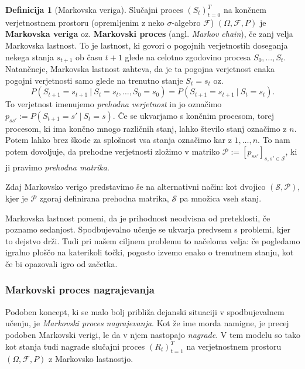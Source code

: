 \documentclass[12pt,a4paper]{amsart}
\theoremstyle{definition} %
\newtheorem{definicija}{Definicija}[section]
\theoremstyle{plain} %
\begin{document}
\begin{definicija}[Markovska veriga]\label{MarkovChain}
    Slučajni proces $(S_t)_{t=0}^T$ na končnem verjetnostnem prostoru (opremljenim z neko $\sigma$-algebro
    $\mathcal{F}$) $(\Omega, \mathcal{F}, P)$ je \textbf{Markovska veriga} oz. \textbf{Markovski proces} 
    (angl. \textit{Markov chain}), če zanj velja Markovska lastnost. To je lastnost, ki govori o 
    pogojnih verjetnostih doseganja nekega stanja $s_{t+1}$ ob času $t + 1$ glede na celotno zgodovino
    procesa $S_0, \dots, S_{t}$. Natančneje, Markovska lastnost zahteva, da je ta pogojna verjetnost 
    enaka pogojni verjetnosti samo glede na trenutno stanje $S_{t} = s_{t}$ oz.
    $$
    P(S_{t+1} = s_{t+1}~|~S_{t} = s_{t}, \dots, S_0 = s_0) = P(S_{t+1} = s_{t+1}~|~S_{t} = s_{t}).
    $$
    To verjetnost imenujemo \textit{prehodna verjetnost} in jo označimo $p_{ss'} := P(S_{t+1} = 
    s'~|~S_{t} = s)$. Če se ukvarjamo s končnim procesom, torej procesom, ki ima končno mnogo 
    različnih stanj, lahko število stanj označimo z $n$. Potem lahko brez škode za splošnost 
    vsa stanja označimo kar z $1, \dots, n$. To nam potem dovoljuje, da prehodne verjetnosti zložimo v 
    matriko $\mathcal{P} := [p_{ss'}]_{s,s'\in \mathcal{S} }$, ki ji pravimo \textit{prehodna matrika}.

    Zdaj Markovsko verigo predstavimo še na alternativni način: kot dvojico $(\mathcal{S}, 
    \mathcal{P})$, kjer je $\mathcal{P}$ zgoraj definirana prehodna matrika, $\mathcal{S}$ pa 
    množica vseh stanj.
\end{definicija}

Markovska lastnost pomeni, da je prihodnost neodvisna od preteklosti, če poznamo sedanjost. 
Spodbujevalno učenje se ukvarja predvsem s problemi, kjer to dejstvo drži. Tudi pri našem 
ciljnem problemu to načeloma velja: če pogledamo igralno ploščo na katerikoli točki, pogosto 
izvemo enako o trenutnem stanju, kot če bi opazovali igro od začetka.

\subsubsection{Markovski proces nagrajevanja}
Podoben koncept, ki se malo bolj približa dejanski situaciji v spodbujevalnem učenju, je
\textit{Markovski proces nagrajevanja}. Kot že ime morda namigne, je precej podoben Markovski 
verigi, le da v njem nastopajo \textit{nagrade}. V tem modelu so tako kot stanja tudi nagrade 
slučajni proces $(R_t)_{t=1}^T$ na verjetnostnem prostoru $(\Omega, \mathcal{F}, P)$ z Markovsko 
lastnostjo.
\end{document}
